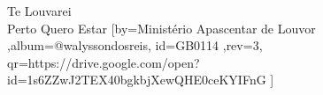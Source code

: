 \beginsong
{Te Louvarei \\ Perto Quero Estar %
}[by={Ministério Apascentar de Louvor %
},album={@walyssondosreis},
id={GB0114 %
},rev={3}, %
qr={https://drive.google.com/open?id=1s6ZZwJ2TEX40bgkbjXewQHE0ceKYIFnG %
}]
\beginverse
